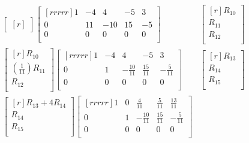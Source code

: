 \documentclass[12pt]{article}
\begin{document}
\begin{enumerate}
\begin{enumerate}
\begin{align*}
\begin{bmatrix}[r]
	\end{bmatrix}
	\begin{bmatrix}[rrrrr]
	1 & -4 & 4 & -5 & 3\\
	0 & 11 & -10 & 15 & -5\\
	0 & 0 & 0 & 0 & 0\\
	\end{bmatrix}&
	\begin{bmatrix}[r]
	R_{10}\\ R_{11}\\ R_{12}\\
	\end{bmatrix}\\
	\begin{bmatrix}[r]
	R_{10}\\
	(\frac{1}{11})R_{11}\\
	R_{12}\\
	\end{bmatrix}
	\begin{bmatrix}[rrrrr]
	1 & -4 & 4 & -5 & 3\\
	0 & 1 & -\frac{10}{11} & \frac{15}{11} & -\frac{5}{11}\\
	0 & 0 & 0 & 0 & 0\\
	\end{bmatrix}&
	\begin{bmatrix}[r]
	R_{13}\\ R_{14}\\ R_{15}\\
	\end{bmatrix}\\
	\begin{bmatrix}[r]
	R_{13} + 4R_{14}\\
	R_{14}\\
	R_{15}\\
	\end{bmatrix}
	\begin{bmatrix}[rrrrr]
	1 & 0 & \frac{4}{11} & \frac{5}{11} & \frac{13}{11}\\
	0 & 1 & -\frac{10}{11} & \frac{15}{11} & -\frac{5}{11}\\
	0 & 0 & 0 & 0 & 0\\
	\end{bmatrix}&
	\end{align*}
	\end{enumerate}
	

\end{enumerate}
\end{document}
